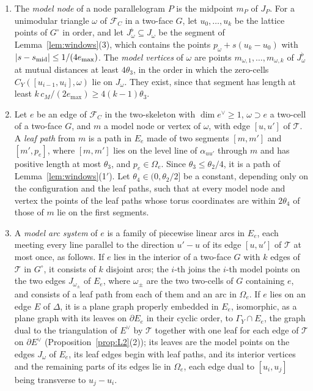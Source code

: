 \begin{definition}\label{def:modelpos}
\begin{enumerate}
\item The \emph{model node} of a node parallelogram $P$ is the midpoint $m_P$ of $J_P$. For a unimodular triangle $\omega$
of $\mathcal F_C$ in a two-face $G$, let $u_0,\dots,u_k$ be the lattice points of $G^\circ$ in order, and let $J^\flat_\omega\subseteq J_\omega$
be the segment of Lemma~\ref{lem:windows}(3), which contains the points $p_\omega+s(u_k-u_0)$ with $|s-s_{\rm mid}|\le
1/(4e_{\max})$. The \emph{model vertices} of $\omega$ are points
$m_{\omega,1},\dots,m_{\omega,k}$ of $J^\flat_\omega$ at mutual distances at least $4\theta_3$, in the order in which the
zero-cells $C_Y([u_{i-1},u_i],\omega)$ lie on $J_\omega$. They exist, since that segment has length at least
$k\,c_M/(2e_{\max})\ge4(k-1)\theta_3$.
\item Let $e$ be an edge of $\mathcal F_C$ in the two-skeleton with $\dim e^\vee\ge1$, $\omega\supset e$ a two-cell of a
two-face $G$, and $m$ a model node or vertex of $\omega$, with edge $[u,u']$ of $\mathcal T$. A \emph{leaf path} from $m$
is a path in $E_e$ made of two segments $[m,m']$ and $[m',p_e]$, where $[m,m']$ lies on the level line of $\alpha_{uu'}$
through $m$ and has positive length at most $\theta_3$, and $p_e\in\Omega_e$. Since $\theta_3\le\theta_2/4$, it is a path
of Lemma~\ref{lem:windows}(1$'$). Let $\theta_4\in(0,\theta_2/2]$ be a constant, depending only on the
configuration and the leaf paths, such that at every model node and vertex the points of the leaf paths whose torus
coordinates are within $2\theta_4$ of those of $m$ lie on the first segments.
\item A \emph{model arc system} of $e$ is a family of piecewise linear arcs in $E_e$, each meeting every line parallel to
the direction $u'-u$ of its edge $[u,u']$ of $\mathcal T$ at most once, as follows. If $e$ lies in the interior of a
two-face $G$ with $k$ edges of $\mathcal T$ in $G^\circ$, it consists of $k$ disjoint arcs; the $i$-th joins the $i$-th
model points on the two edges $J_{\omega_\pm}$ of $E_e$, where $\omega_\pm$ are the two two-cells of $G$ containing $e$,
and consists of a leaf path from each of them and an arc in $\Omega_e$. If $e$ lies on an edge $E$ of $\Delta$, it is a
plane graph properly embedded in $E_e$, isomorphic, as a plane graph with its leaves on $\partial E_e$ in their cyclic
order, to $\Gamma_Y\cap E_e$, the graph dual to the triangulation of $E^\vee$ by $\mathcal T$ together with one leaf for
each edge of $\mathcal T$ on $\partial E^\vee$ (Proposition~\ref{prop:L2}(2)); its leaves are the model points on the
edges $J_\omega$ of $E_e$, its leaf edges begin with leaf paths, and its interior vertices and the remaining parts of
its edges lie in $\Omega_e$, each edge dual to $[u_i,u_j]$ being transverse to $u_j-u_i$.
\end{enumerate}
\end{definition}

